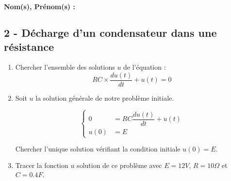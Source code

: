 \documentclass[12pt]{article}
\begin{document}

\setlength{\columnseprule}{1pt}

\textbf{Nom(s), Prénom(s) :}

\subsection*{2 - Décharge d'un condensateur dans une résistance}



\begin{enumerate}
\item Chercher l'ensemble des solutions $u$ de l'équation :
  $$ RC \times \dfrac{du(t)}{dt} + u(t) = 0 $$

\item Soit $u$ la solution générale de notre problème initiale.

  \begin{equation*}
    \left\lbrace
    \begin{array}{ccc}
      0 &= RC\dfrac{du(t)}{dt} + u(t)\\
      u(0) &= E
    \end{array}\right.
  \end{equation*}


  Chercher l'unique solution vérifiant la condition initiale $u(0) = E$. 
\item Tracer la fonction $u$ solution de ce problème avec $E = 12V$, $R = 10\Omega$ et $C = 0.4F$.
\end{enumerate}
\end{document}
